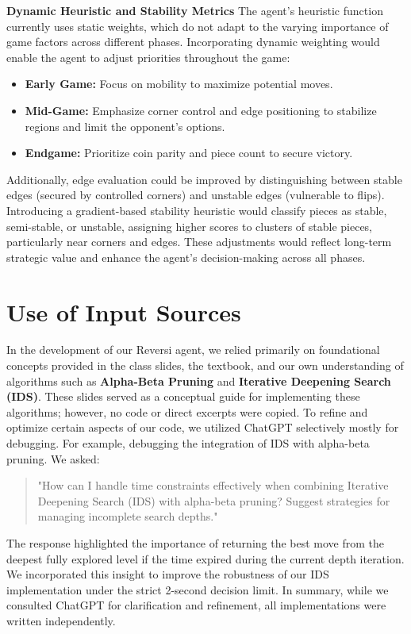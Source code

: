 \documentclass[11pt]{article}
\begin{document}
\noindent \textbf{Dynamic Heuristic and Stability Metrics}  
The agent's heuristic function currently uses static weights, which do not adapt to the varying importance of game factors across different phases. Incorporating dynamic weighting would enable the agent to adjust priorities throughout the game:  
\begin{itemize}
    \item \textbf{Early Game:} Focus on mobility to maximize potential moves.
    \item \textbf{Mid-Game:} Emphasize corner control and edge positioning to stabilize regions and limit the opponent’s options.
    \item \textbf{Endgame:} Prioritize coin parity and piece count to secure victory.
\end{itemize}
Additionally, edge evaluation could be improved by distinguishing between stable edges (secured by controlled corners) and unstable edges (vulnerable to flips). Introducing a gradient-based stability heuristic would classify pieces as stable, semi-stable, or unstable, assigning higher scores to clusters of stable pieces, particularly near corners and edges. These adjustments would reflect long-term strategic value and enhance the agent’s decision-making across all phases.

\section*{Use of Input Sources}

In the development of our Reversi agent, we relied primarily on foundational concepts provided in the class slides, the textbook, and our own understanding of algorithms such as \textbf{Alpha-Beta Pruning} and \textbf{Iterative Deepening Search (IDS)}. These slides served as a conceptual guide for implementing these algorithms; however, no code or direct excerpts were copied. To refine and optimize certain aspects of our code, we utilized ChatGPT selectively mostly for debugging. For example, debugging the integration of IDS with alpha-beta pruning. We asked:
\begin{quote}
    "How can I handle time constraints effectively when combining Iterative Deepening Search (IDS) with alpha-beta pruning? Suggest strategies for managing incomplete search depths."
\end{quote}
The response highlighted the importance of returning the best move from the deepest fully explored level if the time expired during the current depth iteration. We incorporated this insight to improve the robustness of our IDS implementation under the strict 2-second decision limit. In summary, while we consulted ChatGPT for clarification and refinement, all implementations were written independently.
\end{document}
